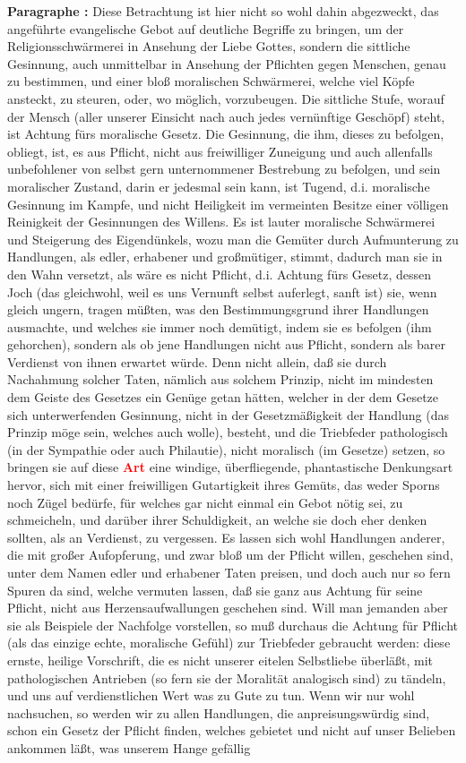 \documentclass[a4paper,12pt,twoside]{book}
\newcommand{\match}[1]{\textcolor{red}{\textbf{#1}}}
\begin{document}
	\noindent\textbf{Paragraphe : }
	Diese Betrachtung ist hier nicht so wohl dahin abgezweckt, das angeführte evangelische Gebot auf deutliche Begriffe zu bringen, um der Religionsschwärmerei in Ansehung der Liebe Gottes, sondern die sittliche Gesinnung, auch unmittelbar in Ansehung der Pflichten gegen Menschen, genau zu bestimmen, und einer bloß moralischen Schwärmerei, welche viel Köpfe ansteckt, zu steuren, oder, wo möglich, vorzubeugen. Die sittliche Stufe, worauf der Mensch (aller unserer Einsicht nach auch jedes vernünftige Geschöpf) steht, ist Achtung fürs moralische Gesetz. Die Gesinnung, die ihm, dieses zu befolgen, obliegt, ist, es aus Pflicht, nicht aus freiwilliger Zuneigung und auch allenfalls unbefohlener von selbst gern unternommener Bestrebung zu befolgen, und sein moralischer Zustand, darin er jedesmal sein kann, ist Tugend, d.i. moralische Gesinnung im Kampfe, und nicht Heiligkeit im vermeinten Besitze einer völligen Reinigkeit der Gesinnungen des Willens. Es ist lauter moralische Schwärmerei und Steigerung des Eigendünkels, wozu man die Gemüter durch Aufmunterung zu Handlungen, als edler, erhabener und großmütiger, stimmt, dadurch man sie in den Wahn versetzt, als wäre es nicht Pflicht, d.i. Achtung fürs Gesetz, dessen Joch (das gleichwohl, weil es uns Vernunft selbst auferlegt, sanft ist) sie, wenn gleich ungern, tragen müßten, was den Bestimmungsgrund ihrer Handlungen ausmachte, und welches sie immer noch demütigt, indem sie es befolgen (ihm gehorchen), sondern als ob jene Handlungen nicht aus Pflicht, sondern als barer Verdienst von ihnen erwartet würde. Denn nicht allein, daß sie durch Nachahmung solcher Taten, nämlich aus solchem Prinzip, nicht im mindesten dem Geiste des Gesetzes ein Genüge getan hätten, welcher in der dem Gesetze sich unterwerfenden Gesinnung, nicht in der Gesetzmäßigkeit der Handlung (das Prinzip möge sein, welches auch wolle), besteht, und die Triebfeder pathologisch (in der Sympathie oder auch Philautie), nicht moralisch (im Gesetze) setzen, so bringen sie auf diese \match{Art} eine windige, überfliegende, phantastische Denkungsart hervor, sich mit  einer freiwilligen Gutartigkeit ihres Gemüts, das weder Sporns noch Zügel bedürfe, für welches gar nicht einmal ein Gebot nötig sei, zu schmeicheln, und darüber ihrer Schuldigkeit, an welche sie doch eher denken sollten, als an Verdienst, zu vergessen. Es lassen sich wohl Handlungen anderer, die mit großer Aufopferung, und zwar bloß um der Pflicht willen, geschehen sind, unter dem Namen edler und erhabener Taten preisen, und doch auch nur so fern Spuren da sind, welche vermuten lassen, daß sie ganz aus Achtung für seine Pflicht, nicht aus Herzensaufwallungen geschehen sind. Will man jemanden aber sie als Beispiele der Nachfolge vorstellen, so muß durchaus die Achtung für Pflicht (als das einzige echte, moralische Gefühl) zur Triebfeder gebraucht werden: diese ernste, heilige Vorschrift, die es nicht unserer eitelen Selbstliebe überläßt, mit pathologischen Antrieben (so fern sie der Moralität analogisch sind) zu tändeln, und uns auf verdienstlichen Wert was zu Gute zu tun. Wenn wir nur wohl nachsuchen, so werden wir zu allen Handlungen, die anpreisungswürdig sind, schon ein Gesetz der Pflicht finden, welches gebietet und nicht auf unser Belieben ankommen läßt, was unserem Hange gefällig 
\end{document}
